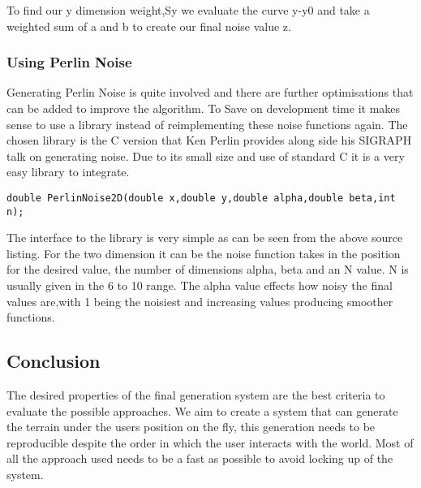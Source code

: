 To find our y dimension weight,Sy we evaluate the curve y-y0 and take a weighted sum
of a and b to create our final noise value z.\\

\subsubsection*{Using Perlin Noise}
Generating Perlin Noise is quite involved and there are further optimisations that
can be added to improve the algorithm. To Save on development time it makes sense to
use a library instead of reimplementing these noise functions again. The chosen 
library is the C version that Ken Perlin provides along side his SIGRAPH talk on 
generating noise. Due to its small size and use of standard C it is a very easy 
library to integrate.\\

\begin{lstlisting}
double PerlinNoise2D(double x,double y,double alpha,double beta,int n);
\end{lstlisting}

The interface to the library is very simple as can be seen from the above source
listing.
For the two dimension it can be the noise function takes in the 
position for the desired value, the number of dimensions alpha, beta and an N value.
N is usually given
in the 6 to 10 range. The alpha value effects how noisy the final values are,with
1 being the noisiest and increasing values producing smoother functions.\\

\subsection{Conclusion}
The desired properties of the final generation system are the best criteria to
evaluate the possible approaches. We aim to create a system that can generate
the terrain under the users position on the fly, this generation needs to be
reproducible despite the order in which the user interacts with the world. Most
of all the approach used needs to be a fast as possible to avoid locking up of
the system.\\

